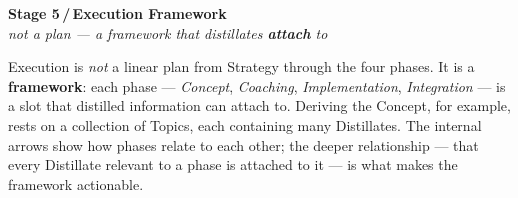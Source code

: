 \documentclass[11pt]{article}
\newcommand{\stage}[3]{%
    {\Large\color{accent}\textbf{Stage #1\,/\,#2}}\\[2pt]
    {\color{soft}\itshape #3}\par\vspace{8pt}%
}
\begin{document}
\begin{center}
{
}
\end{center}

\newpage

\stage{5}{Execution Framework}{not a plan — a framework that distillates \textbf{attach} to}

Execution is \emph{not} a linear plan from Strategy through the four phases.
It is a \textbf{framework}: each phase — \emph{Concept}, \emph{Coaching},
\emph{Implementation}, \emph{Integration} — is a slot that distilled
information can attach to. Deriving the Concept, for example, rests on a
collection of Topics, each containing many Distillates. The internal
arrows show how phases relate to each other; the deeper relationship —
that every Distillate relevant to a phase is attached to it — is what
makes the framework actionable.
\end{document}
